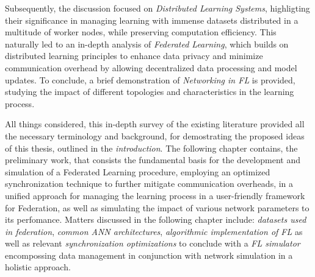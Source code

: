 Subsequently, the discussion focused on \emph{Distributed Learning Systems}, highligting their significance in managing
learning with immense datasets distributed in a multitude of worker nodes, while preserving computation efficiency.
This naturally led to an in-depth analysis of \emph{Federated Learning}, which builds on distributed learning principles
to enhance data privacy and minimize communication overhead by allowing decentralized data processing and model updates.
To conclude, a brief demonstration of \emph{Networking in FL} is provided, studying the impact of different topologies
and characteristics in the learning process.

All things considered, this in-depth survey of the existing literature provided all the necessary terminology and background,
for demostrating the proposed ideas of this thesis, outlined in the \emph{introduction}. The following chapter contains, the preliminary
work, that consists the fundamental basis for the development and simulation of a Federated Learning procedure, employing an optimized
synchronization technique to further mitigate communication overheads, in a unified approach for managing the learning process in a user-friendly
framework for Federation, as well as simulating the impact of various network parameters to its perfomance. Matters discussed in the following
chapter include: \emph{datasets used in federation}, \emph{common ANN architectures}, \emph{algorithmic implementation of FL} as well as
relevant \emph{synchronization optimizations} to conclude with a \emph{FL simulator} encompossing data management in conjunction with network
simulation in a holistic approach.

